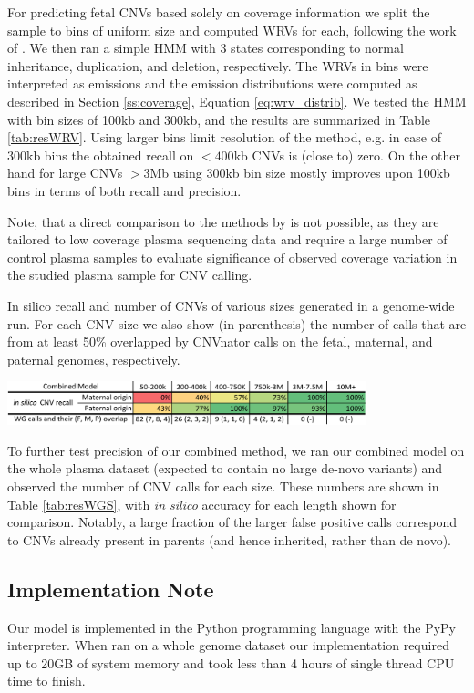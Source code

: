 For predicting fetal CNVs based solely on coverage information we split the sample to bins of uniform size and computed WRVs for each, following the work of \cite{srinivasan2013}. We then ran a simple HMM with 3 states corresponding to normal inheritance, duplication, and deletion, respectively. The WRVs in bins were interpreted as emissions and the emission distributions were computed as described in Section \ref{ss:coverage}, Equation \ref{eq:wrv_distrib}. We tested the HMM with bin sizes of 100kb and 300kb, and the results are summarized in Table \ref{tab:resWRV}. Using larger bins limit resolution of the method, e.g. in case of 300kb bins the obtained recall on ${<400}$kb CNVs is (close to) zero. On the other hand for large CNVs ${>3}$Mb using 300kb bin size mostly improves upon 100kb bins in terms of both recall and precision.

Note, that a direct comparison to the methods by \cite{chen2013, srinivasan2013} is not possible, as they are tailored to low coverage plasma sequencing data and require a large number of control plasma samples to evaluate significance of observed coverage variation in the studied plasma sample for CNV calling. 


\begin{table}
\caption{In silico recall and number of CNVs of various sizes generated in a genome-wide run. For each CNV size we also show (in parenthesis) the number of calls that are from at least 50\% overlapped by CNVnator \citep{abyzov2011cnvnator} calls on the fetal, maternal, and paternal genomes, respectively.}
\label{tab:resWGS}
\centering
\includegraphics[width=0.78\textwidth]{figures/wg_calls_color}
\end{table}

To further test precision of our combined method, we ran our combined model on the whole plasma dataset (expected to contain no large de-novo variants) and observed the number of CNV calls for each size. These numbers are shown in Table \ref{tab:resWGS}, with \textit{in silico} accuracy for each length shown for comparison. Notably, a large fraction of the larger false positive calls correspond to CNVs already present in parents (and hence inherited, rather than de novo). 

\subsection{Implementation Note}
Our model is implemented in the Python programming language with the PyPy interpreter. When ran on a 	whole genome dataset our implementation required up to 20GB of system memory and took less than 4 hours of single thread CPU time to finish.
